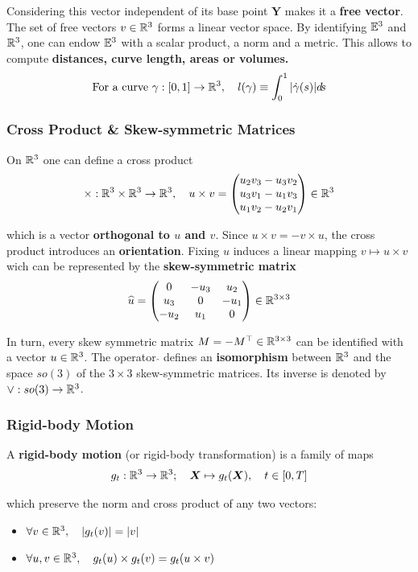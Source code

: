 Considering this vector independent of its base point $\bm{Y}$ makes
it a \textbf{free vector}. The set of free vectors $v \in \R^3$
forms a linear vector space. By identifying $\E^3$ and $\R^3$,
one can endow $\E^3$ with a scalar product, a norm and a metric.
This allows to compute \textbf{distances, curve length, areas or volumes.}
\[\text{For a curve } \gamma : [0,1] \rightarrow \R^3,\quad
	l(\gamma) \equiv \int_{0}^1 | \dot{\gamma}(s) | d\!s\]


\subsubsection{Cross Product \& Skew-symmetric Matrices}%
\label{ssub:cross_product_and_skew_symmetric_matrices}

On $\R^3$ one can define a cross product
\[\times : \R^3 \times \R^3 \rightarrow \R^3,\quad u \times v =
	\begin{pmatrix}
		u_2v_3 - u_3v_2 \\
		u_3v_1 - u_1v_3 \\
		u_1v_2 - u_2v_1
	\end{pmatrix} \in \R^3\]

which is a vector \textbf{orthogonal to $u$ and $v$}.
Since $u \times v = -v \times u$, the cross product introduces an \textbf{orientation}.
Fixing $u$ induces a linear mapping $v \mapsto u \times v$ wich
can be represented by the \textbf{skew-symmetric matrix}
\[\widehat{u} = \hatmat{u_1}{u_2}{u_3} \in \RR{3}{3}\]

In turn, every skew symmetric matrix $M = -\tr{M} \in \RR{3}{3}$
can be identified with a vector $u \in \R^3$.
The operator $\widehat{}$ defines an \textbf{isomorphism} between $\R^3$
and the space $so(3)$ of the $3 \times 3$ skew-symmetric matrices.
Its inverse is denoted by $\vee : so(3) \rightarrow \R^3$.


\subsubsection{Rigid-body Motion}%
\label{ssub:rigid_body_motion}

A \textbf{rigid-body motion} (or rigid-body transformation)
is a family of maps
\[g_t : \R^3 \rightarrow \R^3;\quad \bm{X} \mapsto g_t(\bm{X}),\quad t \in [0,T]\]

which preserve the norm and cross product of any two vectors:
\begin{itemize}
	\setlength\itemsep{-0.2em}
	\item $\forall v \in \R^3, \quad |g_t(v)| = |v|$
	\item $\forall u,v \in \R^3, \quad g_t(u) \times g_t(v) = g_t(u \times v)$
\end{itemize}

